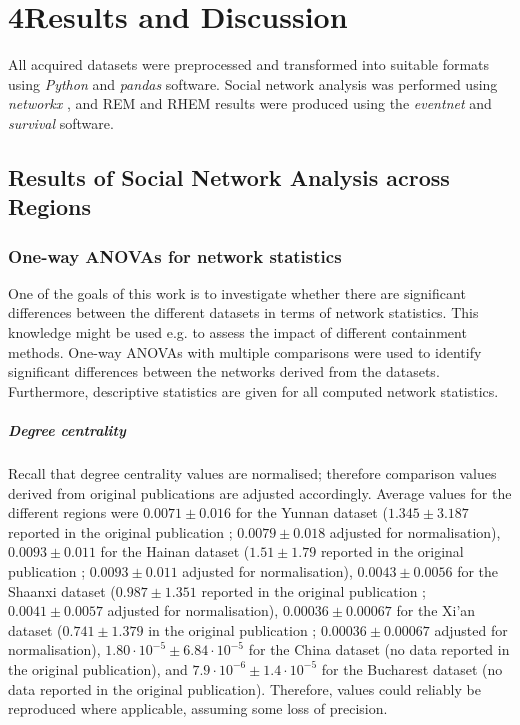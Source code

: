 \chapter{4\quad Results and Discussion}
\label{ch:results_discussion}

All acquired datasets were preprocessed and transformed into suitable formats using \emph{Python} \cite{python} and \emph{pandas} \cite{pandas} software. Social network analysis was performed using \emph{networkx} \cite{networkx}, and REM and RHEM results were produced using the \emph{eventnet} \cite{eventnet_rem,eventnet_rhem} and \emph{survival} \cite{survival-package} software.

\section{Results of Social Network Analysis across Regions}
\label{sec:res_sna}

\subsection{One-way ANOVAs for network statistics}
\label{sec:sna_anovas}

One of the goals of this work is to investigate whether there are significant differences between the different datasets in terms of network statistics. This knowledge might be used e.g. to assess the impact of different containment methods. One-way ANOVAs with multiple comparisons were used to identify significant differences between the networks derived from the datasets. Furthermore, descriptive statistics are given for all computed network statistics.

\paragraph{Degree centrality} Recall that degree centrality values are normalised; therefore comparison values derived from original publications are adjusted accordingly. Average values for the different regions were $0.0071\pm0.016$ for the Yunnan dataset ($1.345\pm3.187$ reported in the original publication \cite{hainan_publication}; $0.0079\pm0.018$ adjusted for normalisation), $0.0093\pm0.011$ for the Hainan dataset ($1.51\pm1.79$ reported in the original publication \cite{hainan_publication}; $0.0093\pm0.011$ adjusted for normalisation), $0.0043\pm0.0056$ for the Shaanxi dataset ($0.987\pm1.351$ reported in the original publication \cite{shaanxi_publication}; $0.0041\pm0.0057$ adjusted for normalisation), $0.00036\pm0.00067$ for the Xi'an dataset ($0.741\pm1.379$ in the original publication \cite{xian_publication}; $0.00036\pm0.00067$ adjusted for normalisation), $1.80\cdot 10^{-5}\pm6.84\cdot 10^{-5}$ for the China dataset (no data reported in the original publication), and $7.9\cdot 10^{-6}\pm1.4\cdot 10^{-5}$ for the Bucharest dataset (no data reported in the original publication). Therefore, values could reliably be reproduced where applicable, assuming some loss of precision.

